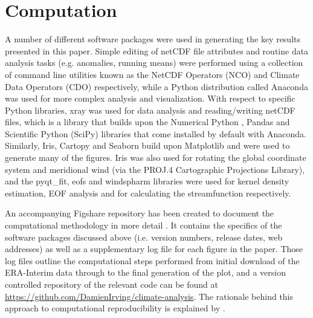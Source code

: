 \section{Computation}

A number of different software packages were used in generating the key results presented in this paper. Simple editing of netCDF file attributes and routine data analysis tasks (e.g. anomalies, running means) were performed using a collection of command line utilities known as the NetCDF Operators (NCO) and Climate Data Operators (CDO) respectively, while a Python distribution called Anaconda was used for more complex analysis and visualization. With respect to specific Python libraries, xray was used for data analysis and reading/writing netCDF files, which is a library that builds upon the Numerical Python \citep[NumPy;][]{VanDerWalt2011}, Pandas and Scientific Python (SciPy) libraries that come installed by default with Anaconda. Similarly, Iris, Cartopy and Seaborn build upon Matplotlib \citep[the default Python plotting library;][]{Hunter2007} and were used to generate many of the figures. Iris was also used for rotating the global coordinate system and meridional wind (via the PROJ.4 Cartographic Projections Library), and the pyqt\_fit, eofs and windspharm libraries were used for kernel density estimation, EOF analysis and for calculating the streamfunction respectively.

An accompanying Figshare repository has been created to document the computational methodology in more detail \citep{Irving2016a}. It contains the specifics of the software packages discussed above (i.e. version numbers, release dates, web addresses) as well as a supplementary log file for each figure in the paper. Those log files outline the computational steps performed from initial download of the ERA-Interim data through to the final generation of the plot, and a version controlled repository of the relevant code can be found at \url{https://github.com/DamienIrving/climate-analysis}. The rationale behind this approach to computational reproducibility is explained by \citet{Irving2016}.